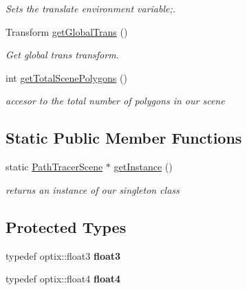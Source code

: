 \begin{DoxyCompactItemize}
\begin{DoxyCompactList}\small\item\em Sets the translate environment variable;. \end{DoxyCompactList}\item 
\hypertarget{class_path_tracer_scene_a8f178699fbd142dda137f76bf65e6723}{Transform \hyperlink{class_path_tracer_scene_a8f178699fbd142dda137f76bf65e6723}{get\-Global\-Trans} ()}\label{class_path_tracer_scene_a8f178699fbd142dda137f76bf65e6723}

\begin{DoxyCompactList}\small\item\em Get global trans transform. \end{DoxyCompactList}\item 
\hypertarget{class_path_tracer_scene_a77851dbba5a8549f028fe68ae45f68cd}{int \hyperlink{class_path_tracer_scene_a77851dbba5a8549f028fe68ae45f68cd}{get\-Total\-Scene\-Polygons} ()}\label{class_path_tracer_scene_a77851dbba5a8549f028fe68ae45f68cd}

\begin{DoxyCompactList}\small\item\em accesor to the total number of polygons in our scene \end{DoxyCompactList}\end{DoxyCompactItemize}
\subsection*{Static Public Member Functions}
\begin{DoxyCompactItemize}
\item 
\hypertarget{class_path_tracer_scene_aaf30f931afe7fc4df149c5754ec273d0}{static \hyperlink{class_path_tracer_scene}{Path\-Tracer\-Scene} $\ast$ \hyperlink{class_path_tracer_scene_aaf30f931afe7fc4df149c5754ec273d0}{get\-Instance} ()}\label{class_path_tracer_scene_aaf30f931afe7fc4df149c5754ec273d0}

\begin{DoxyCompactList}\small\item\em returns an instance of our singleton class \end{DoxyCompactList}\end{DoxyCompactItemize}
\subsection*{Protected Types}
\begin{DoxyCompactItemize}
\item 
\hypertarget{class_path_tracer_scene_aa3ea1f854f75f6b6a2f432d4525dfb92}{typedef optix\-::float3 {\bfseries float3}}\label{class_path_tracer_scene_aa3ea1f854f75f6b6a2f432d4525dfb92}

\item 
\hypertarget{class_path_tracer_scene_a47510172bf7d645109a033327e3899a2}{typedef optix\-::float4 {\bfseries float4}}\label{class_path_tracer_scene_a47510172bf7d645109a033327e3899a2}

\end{DoxyCompactItemize}
